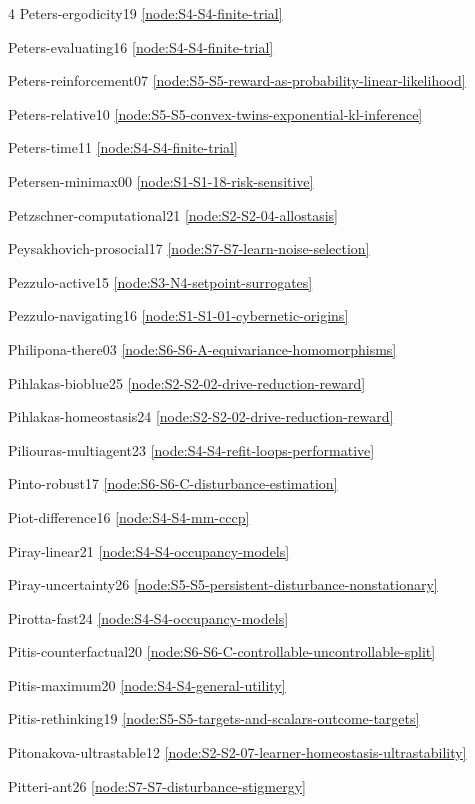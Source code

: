 \documentclass[10pt]{article}
\begin{document}
{\begin{multicols}{4}
Peters-ergodicity19 \hfill \ref{node:S4-S4-finite-trial}\par
Peters-evaluating16 \hfill \ref{node:S4-S4-finite-trial}\par
Peters-reinforcement07 \hfill \ref{node:S5-S5-reward-as-probability-linear-likelihood}\par
Peters-relative10 \hfill \ref{node:S5-S5-convex-twins-exponential-kl-inference}\par
Peters-time11 \hfill \ref{node:S4-S4-finite-trial}\par
Petersen-minimax00 \hfill \ref{node:S1-S1-18-risk-sensitive}\par
Petzschner-computational21 \hfill \ref{node:S2-S2-04-allostasis}\par
Peysakhovich-prosocial17 \hfill \ref{node:S7-S7-learn-noise-selection}\par
Pezzulo-active15 \hfill \ref{node:S3-N4-setpoint-surrogates}\par
Pezzulo-navigating16 \hfill \ref{node:S1-S1-01-cybernetic-origins}\par
Philipona-there03 \hfill \ref{node:S6-S6-A-equivariance-homomorphisms}\par
Pihlakas-bioblue25 \hfill \ref{node:S2-S2-02-drive-reduction-reward}\par
Pihlakas-homeostasis24 \hfill \ref{node:S2-S2-02-drive-reduction-reward}\par
Piliouras-multiagent23 \hfill \ref{node:S4-S4-refit-loops-performative}\par
Pinto-robust17 \hfill \ref{node:S6-S6-C-disturbance-estimation}\par
Piot-difference16 \hfill \ref{node:S4-S4-mm-cccp}\par
Piray-linear21 \hfill \ref{node:S4-S4-occupancy-models}\par
Piray-uncertainty26 \hfill \ref{node:S5-S5-persistent-disturbance-nonstationary}\par
Pirotta-fast24 \hfill \ref{node:S4-S4-occupancy-models}\par
Pitis-counterfactual20 \hfill \ref{node:S6-S6-C-controllable-uncontrollable-split}\par
Pitis-maximum20 \hfill \ref{node:S4-S4-general-utility}\par
Pitis-rethinking19 \hfill \ref{node:S5-S5-targets-and-scalars-outcome-targets}\par
Pitonakova-ultrastable12 \hfill \ref{node:S2-S2-07-learner-homeostasis-ultrastability}\par
Pitteri-ant26 \hfill \ref{node:S7-S7-disturbance-stigmergy}\par

\end{multicols}}
\end{document}

